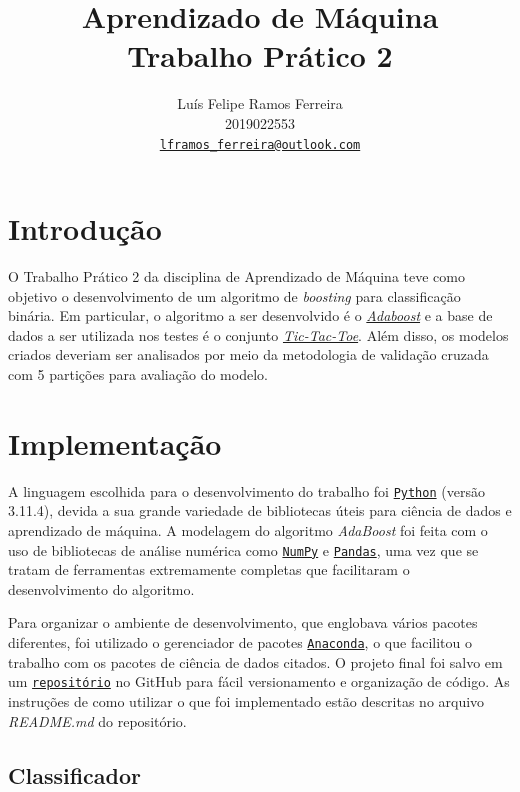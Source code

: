 \documentclass{article}
\title{Aprendizado de Máquina \\ Trabalho Prático 2}
\author{Luís Felipe Ramos Ferreira \\ 2019022553 \\
    \href{mailto:lframos_ferreira@outlook.com}{\texttt{lframos\_ferreira@outlook.com}}}
\begin{document}
\maketitle

\section{Introdução}

O Trabalho Prático 2 da disciplina de Aprendizado de Máquina teve como objetivo
o desenvolvimento de um algoritmo de \textit{boosting}
para classificação binária. Em particular, o algoritmo a ser desenvolvido é o
\href{https://en.wikipedia.org/wiki/AdaBoost}{\textit{Adaboost}} e a base de
dados a ser
utilizada nos testes é o conjunto
\href{https://archive.ics.uci.edu/ml/datasets/Tic-Tac-Toe+Endgame}{\textit{Tic-Tac-Toe}}.
Além disso, os modelos criados deveriam
ser analisados por meio da metodologia de validação cruzada com 5 partições
para avaliação do modelo.

\section{Implementação}

A linguagem escolhida para o desenvolvimento do trabalho foi
\href{https://www.python.org/}{\texttt{Python}} (versão 3.11.4), devida a sua
grande variedade de bibliotecas úteis para ciência de dados e aprendizado de
máquina.
A modelagem do algoritmo \textit{AdaBoost} foi feita com o uso de bibliotecas
de análise numérica como \href{https://numpy.org/}{\texttt{NumPy}} e
\href{https://pandas.pydata.org/}{\texttt{Pandas}},
uma vez que se tratam de ferramentas extremamente completas que facilitaram o
desenvolvimento do algoritmo.

Para organizar o ambiente de desenvolvimento, que englobava vários pacotes
diferentes, foi utilizado o gerenciador de pacotes
\href{https://www.anaconda.com/}{\texttt{Anaconda}}, o que facilitou o trabalho
com os pacotes de ciência de dados citados. O projeto final foi salvo em um
\href{https://github.com/lframosferreira/boosting-process}{\texttt{repositório}}
no GitHub para fácil versionamento e organização de código. As instruções de
como
utilizar o que foi implementado estão descritas no arquivo \textit{README.md}
do repositório.

\subsection{Classificador}
\end{document}
